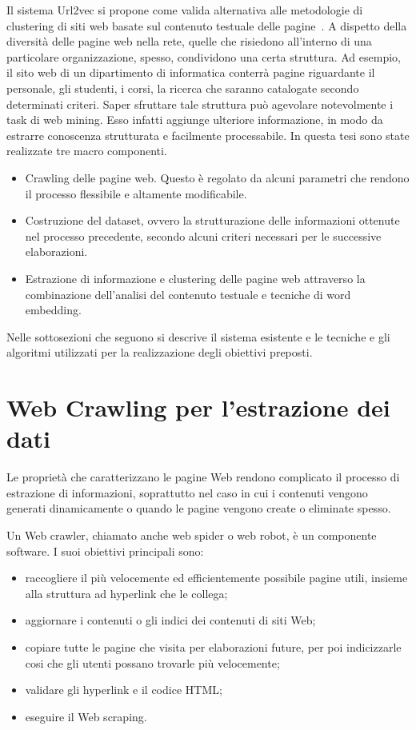 

Il sistema Url2vec si propone come valida alternativa alle metodologie di clustering di siti web basate sul contenuto testuale delle pagine~\cite{Rajaraman11}. A dispetto della diversità delle pagine web nella rete, quelle che risiedono all'interno di una particolare organizzazione, spesso, condividono una certa struttura.
Ad esempio, il sito web di un dipartimento di informatica conterrà pagine riguardante il personale, gli studenti, i corsi, la ricerca che saranno catalogate secondo determinati criteri. Saper sfruttare tale struttura può agevolare notevolmente i task di web mining. Esso infatti aggiunge ulteriore informazione, in modo da estrarre conoscenza strutturata e facilmente processabile. In questa tesi sono state realizzate tre macro componenti.
\begin{itemize}
\item Crawling delle pagine web. Questo è regolato da alcuni parametri che rendono il processo flessibile e altamente modificabile.
\item Costruzione del dataset, ovvero la strutturazione delle informazioni ottenute nel processo precedente, secondo alcuni criteri necessari per le successive elaborazioni.
\item Estrazione di informazione e clustering delle pagine web attraverso la combinazione dell'analisi del contenuto testuale e tecniche di word embedding.
\end{itemize}

Nelle sottosezioni che seguono si descrive il sistema esistente e le tecniche e gli algoritmi utilizzati per la realizzazione degli obiettivi preposti.

\section{Web Crawling per l'estrazione dei dati}
\label{crawling}
Le proprietà che caratterizzano le pagine Web rendono complicato il processo di estrazione di informazioni, soprattutto nel caso in cui i contenuti vengono generati dinamicamente o quando le pagine vengono create o eliminate spesso.

Un Web crawler, chiamato anche web spider o web robot, è un componente software. I suoi obiettivi principali sono:
\begin{itemize}
\item raccogliere il più velocemente ed efficientemente possibile pagine utili, insieme alla struttura ad hyperlink che le collega;
\item aggiornare i contenuti o gli indici dei contenuti di siti Web;
\item copiare tutte le pagine che visita per elaborazioni future, per poi indicizzarle cosi che gli utenti possano trovarle più velocemente;
\item validare gli hyperlink e il codice HTML;
\item eseguire il Web scraping.
\end{itemize}


